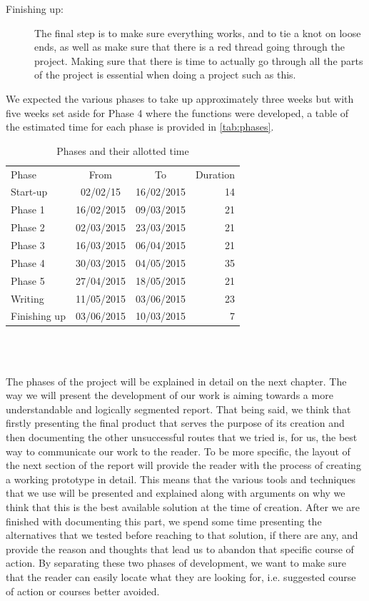 \begin{description}
  \item[Finishing up:]The final step is to make sure everything works, and to tie a knot on loose ends, as well as make sure that there is a red thread going through the project. Making sure that there is time to actually go through all the parts of the project is essential when doing a project such as this. 
\end{description}

We expected the various phases to take up approximately three weeks but with five weeks set aside for Phase 4 where the functions were developed, a table of the estimated time for each phase is provided in \autoref{tab:phases}.\\

\begin{table}[h!]
\centering
\begin{tabular}{l | c | c | r}
Phase & From & To & Duration \\

Start-up & 02/02/15 & 16/02/2015 & 14 \\
Phase 1 & 16/02/2015 & 09/03/2015 & 21 \\
Phase 2 & 02/03/2015 & 23/03/2015 & 21 \\
Phase 3 & 16/03/2015 & 06/04/2015 & 21 \\
Phase 4 & 30/03/2015 & 04/05/2015 & 35 \\
Phase 5 & 27/04/2015 & 18/05/2015 & 21 \\
Writing & 11/05/2015 & 03/06/2015 & 23 \\
Finishing up & 03/06/2015 & 10/03/2015 & 7
\end{tabular} \\
\caption{Phases and their allotted time}
\label{tab:phases}
\end{table}\\

The phases of the project will be explained in detail on the next chapter. The way we will present the development of our work is aiming towards a more understandable and logically segmented report. That being said, we think that firstly presenting the final product that serves the purpose of its creation and then documenting the other unsuccessful routes that we tried is, for us, the best way to communicate our work to the reader. To be more specific, the layout of the next section of the report will provide the reader with the process of creating a working prototype in detail. This means that the various tools and techniques that we use will be presented and explained along with arguments on why we think that this is the best available solution at the time of creation. After we are finished with documenting this part, we spend some time presenting the alternatives that we tested before reaching to that solution, if there are any, and provide the reason and thoughts that lead us to abandon that specific course of action. By separating these two phases of development, we want to make sure that the reader can easily locate what they are looking for, i.e. suggested course of action or courses better avoided. 

